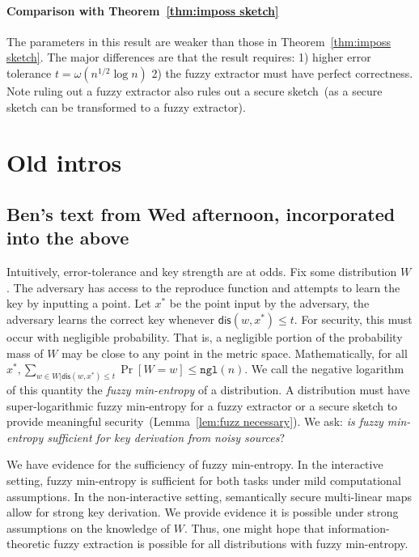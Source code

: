\documentclass[11pt]{article}
\newcommand{\thref}[1]{\mbox{Theorem~\ref{#1}}}
\newcommand{\lemref}[1]{\mbox{Lemma~\ref{#1}}}
\newcommand{\dis}{\ensuremath{\mathsf{dis}}}
\newcommand{\ngl}{\ensuremath{\mathtt{ngl}}\xspace}
\begin{document}
\paragraph{Comparison with \thref{thm:imposs sketch}} The parameters in this result are weaker than those in \thref{thm:imposs sketch}.  The major differences are that the result requires: 1) higher error tolerance $t= \omega(n^{1/2}\log n)$ 2) the fuzzy extractor must have perfect correctness.  Note ruling out a fuzzy extractor also rules out a secure sketch~(as a secure sketch can be transformed to a fuzzy extractor).  



\appendix

\section{Old intros}

\subsection{Ben's text from Wed afternoon, incorporated into the above}

Intuitively, error-tolerance and key strength are at odds.  Fix some distribution $W$.  The adversary has access to the reproduce function and attempts to learn the key by inputting a point.  Let $x^*$ be the point input by the adversary, the adversary learns the correct key whenever $\dis(w, x^*)\le t$.  For security, this must occur with negligible probability.  That is, a negligible portion of the probability mass of $W$ may be close to any point in the metric space.  Mathematically, for all $x^*, \sum_{w\in W | \dis(w, x^*)\le t} \Pr[ W= w] \le \ngl(n)$.  We call the negative logarithm of this quantity the \emph{fuzzy min-entropy} of a distribution.  A distribution must have super-logarithmic fuzzy min-entropy for a fuzzy extractor or a secure sketch  to provide meaningful security~(\lemref{lem:fuzz necessary}).  
We ask:  \emph{is fuzzy min-entropy sufficient for key derivation from noisy sources}?

We have evidence for the sufficiency of fuzzy min-entropy. In the interactive setting, fuzzy min-entropy is sufficient for both tasks under mild computational assumptions.  In the non-interactive setting, semantically secure multi-linear maps allow for strong key derivation.  We provide evidence it is possible under strong assumptions on the knowledge of $W$.  Thus, one might hope that  information-theoretic fuzzy extraction is possible for all distributions with fuzzy min-entropy.
\end{document}

